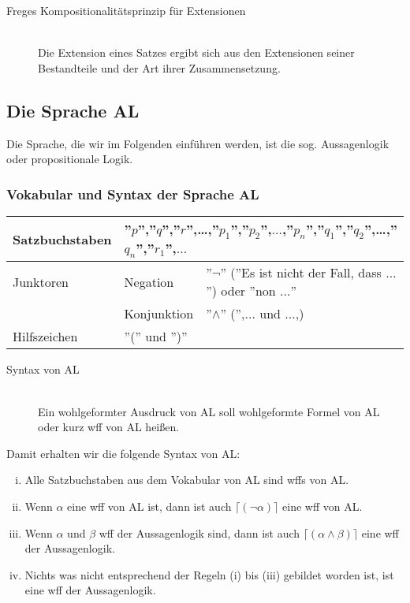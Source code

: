 \documentclass{scrartcl}
\begin{document}
\begin{description}
	\item[Freges Kompositionalitätsprinzip für Extensionen] \mbox{}\\ Die Extension eines Satzes ergibt sich aus den Extensionen seiner Bestandteile und der Art ihrer Zusammensetzung.
\end{description}

\subsection{Die Sprache AL}

Die Sprache, die wir im Folgenden einführen werden, ist die sog. Aussagenlogik oder propositionale Logik.

\subsubsection{Vokabular und Syntax der Sprache AL}

\renewcommand{\arraystretch}{1.5}
\begin{tabularx}{\linewidth}{l l X}
	Satzbuchstaben & \multicolumn{2}{l}{''$ p $'',''$ q $'',''$ r $'',\ldots,''$ p_1 $'',''$ p_2 $'',$ \ldots $,''$ p_n $'',''$ q_1 $'',''$ q_2 $'',\ldots,''$ q_n $'',''$ r_1 $'',$ \ldots $} \\
	\hline
	Junktoren & Negation & ''$ \neg $'' (''Es ist nicht der Fall, dass $ \ldots $'') oder ''non $ \ldots $'' \\
	& Konjunktion & ''$ \wedge $'' ('',$ \ldots $ und $ \ldots $,) \\
	\hline
	Hilfszeichen & \multicolumn{2}{l}{''('' und '')''}
\end{tabularx}

\begin{description}
	\item[Syntax von AL] \mbox{}\\ Ein wohlgeformter Ausdruck von AL soll wohlgeformte Formel von AL oder kurz wff von AL heißen.
\end{description}

Damit erhalten wir die folgende Syntax von AL:
\begin{enumerate}[(i)]
	\item Alle Satzbuchstaben aus dem Vokabular von AL sind wffs von AL.
	\item Wenn $ \alpha $ eine wff von AL ist, dann ist auch $ \lceil (\neg \alpha) \rceil $ eine wff von AL.
	\item Wenn $ \alpha $ und $ \beta $ wff der Aussagenlogik sind, dann ist auch $ \lceil (\alpha \wedge \beta) \rceil $ eine wff der Aussagenlogik.
	\item Nichts was nicht entsprechend der Regeln (i) bis (iii) gebildet worden ist, ist eine wff der Aussagenlogik.
\end{enumerate}
\end{document}
